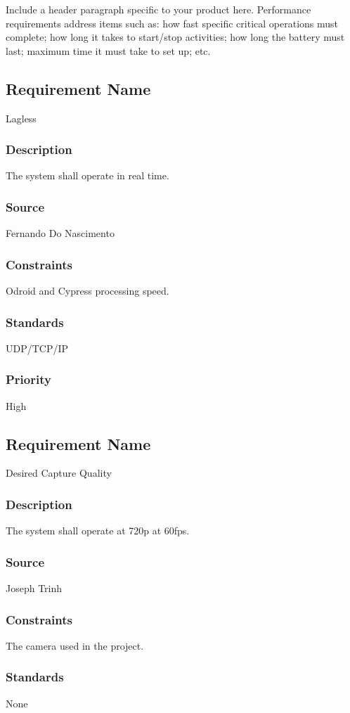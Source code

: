 Include a header paragraph specific to your product here. Performance requirements address items such as: how fast specific critical operations must complete; how long it takes to start/stop activities; how long the battery must last; maximum time it must take to set up; etc.

\subsection{Requirement Name}
Lagless
\subsubsection{Description}
The system shall operate in real time.
\subsubsection{Source}
Fernando Do Nascimento
\subsubsection{Constraints}
Odroid and Cypress processing speed.
\subsubsection{Standards}
UDP/TCP/IP
\subsubsection{Priority}
High

\subsection{Requirement Name}
Desired Capture Quality 
\subsubsection{Description}
The system shall operate at 720p at 60fps.
\subsubsection{Source}
Joseph Trinh
\subsubsection{Constraints}
The camera used in the project.
\subsubsection{Standards}
None
